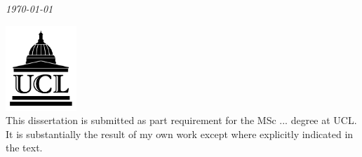\documentclass[11pt,a4paper,oneside]{book}
\begin{document}
\begin{titlepage}
	{\large\textit\today} %
	
       \includegraphics[width=0.2\textwidth]{ucl_logo}\\[1cm] %
	
	
	 This dissertation is submitted as part requirement for the MSc ... degree at UCL. It is substantially the result of my own work except where explicitly 	indicated in the text. 
	 

	

	
\end{titlepage}
\clearpage 
\newpage 

 
\end{document}
